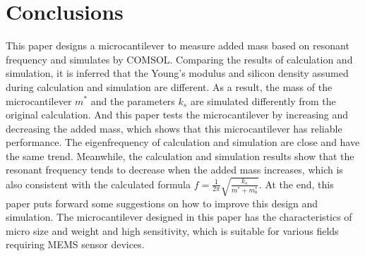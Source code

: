 \documentclass[a4paper,12pt,reqno]{report}
\begin{document}
\section{Conclusions}
    This paper designs a microcantilever to measure added mass based on resonant 
    frequency and simulates by COMSOL. Comparing the results of calculation and 
    simulation, it is inferred that the Young's modulus and silicon density assumed 
    during calculation and simulation are different. As a result, the mass of the microcantilever $m^*$ and the parameters $k_s$ are simulated differently from the original calculation.
    And this paper tests the microcantilever by increasing and decreasing the added mass, which shows 
    that this microcantilever has reliable performance. The eigenfrequency of 
    calculation and simulation are close and have the same trend. Meanwhile, 
    the calculation and simulation results show that the resonant frequency 
    tends to decrease when the added mass increases, which is also consistent 
    with the calculated formula $f=\frac{1}{2\pi}\sqrt{\frac{k_s}{m^*+m_b^*}}$. 
    At the end, this paper puts forward some suggestions on how to improve this design and simulation.
    The microcantilever designed in this paper has the characteristics of micro size and weight and 
    high sensitivity, which is suitable for various fields requiring MEMS sensor devices.
\end{document}
